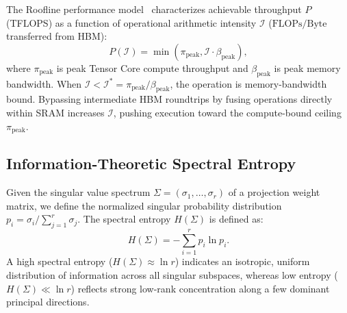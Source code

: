 The Roofline performance model~\cite{williams2009roofline} characterizes achievable throughput $P$ (TFLOPS) as a function of operational arithmetic intensity $\mathcal{I}$ ($\text{FLOPs}/\text{Byte}$ transferred from HBM):
\begin{equation}
P(\mathcal{I}) = \min\left(\pi_{\text{peak}}, \mathcal{I} \cdot \beta_{\text{peak}}\right),
\end{equation}
where $\pi_{\text{peak}}$ is peak Tensor Core compute throughput and $\beta_{\text{peak}}$ is peak memory bandwidth. When $\mathcal{I} < \mathcal{I}^* = \pi_{\text{peak}} / \beta_{\text{peak}}$, the operation is memory-bandwidth bound. Bypassing intermediate HBM roundtrips by fusing operations directly within SRAM increases $\mathcal{I}$, pushing execution toward the compute-bound ceiling $\pi_{\text{peak}}$.

\subsection{Information-Theoretic Spectral Entropy}
Given the singular value spectrum $\Sigma = (\sigma_1, \dots, \sigma_r)$ of a projection weight matrix, we define the normalized singular probability distribution $p_i = \sigma_i / \sum_{j=1}^r \sigma_j$. The spectral entropy $H(\Sigma)$ is defined as:
\begin{equation}
H(\Sigma) = -\sum_{i=1}^r p_i \ln p_i.
\end{equation}
A high spectral entropy ($H(\Sigma) \approx \ln r$) indicates an isotropic, uniform distribution of information across all singular subspaces, whereas low entropy ($H(\Sigma) \ll \ln r$) reflects strong low-rank concentration along a few dominant principal directions.
